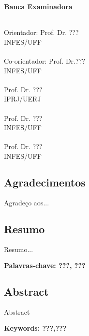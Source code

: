 \begin{center}
\Large \textbf{Banca Examinadora}
\end{center}
\vspace{1.5cm}

\begin{flushright}
\begin{minipage}[l]{12cm}
\begin{center}
\uline{\hspace{10.5cm}} \\
Orientador: Prof. Dr. ??? \\ INFES/UFF \\
\vspace{1cm}
\uline{\hspace{10.5cm}} \\
Co-orientador: Prof. Dr.??? \\ INFES/UFF \\
\vspace{1cm}
\uline{\hspace{10.5cm}} \\
Prof. Dr. ???\\ IPRJ/UERJ\\
\vspace{1cm}
\uline{\hspace{10.5cm}} \\
Prof. Dr. ???\\ INFES/UFF\\
\vspace{1cm}
\uline{\hspace{10.5cm}} \\
Prof. Dr. ??? \\ INFES/UFF


\end{center}
\end{minipage}
\end{flushright}
\newpage
\blankpage

\begin{center}
\section*{Agradecimentos}
\end{center}

Agradeço aos... 

\newpage
\blankpage

\begin{center}
\section*{Resumo}
\end{center}

\noindent 
Resumo...

\vspace{1cm}

\noindent \textbf{Palavras-chave: ???, ???}

\newpage

\blankpage

\begin{center}
\section*{Abstract}
\end{center}

\noindent
Abstract

\vspace{1cm}

\noindent \textbf{Keywords: ???,???}
\newpage
\blankpage

